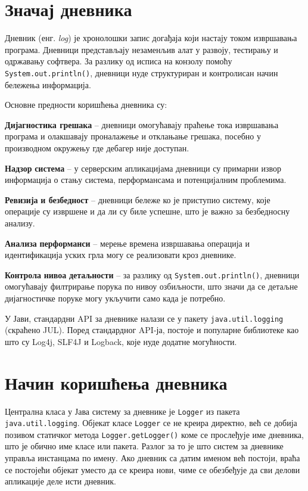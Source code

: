 \section{Значај дневника}

Дневник (енг. \textit{log}) је хронолошки запис догађаја који настају током извршавања програма. Дневници представљају незаменљив алат у развоју, тестирању и одржавању софтвера. За разлику од исписа на конзолу помоћу \texttt{System.out.println()}, дневници нуде структуриран и контролисан начин бележења информација.

Основне предности коришћења дневника су:

\textbf{Дијагностика грешака} – дневници омогућавају праћење тока извршавања програма и олакшавају проналажење и отклањање грешака, посебно у производном окружењу где дебагер није доступан.

\textbf{Надзор} \textbf{система} – у серверским апликацијама дневници су примарни извор информација о стању система, перформансама и потенцијалним проблемима.

\textbf{Ревизија} \textbf{и безбедност} – дневници бележе ко је приступио систему, које операције су извршене и да ли су биле успешне, што је важно за безбедносну анализу.

\textbf{Анализа} \textbf{перформанси} – мерење времена извршавања операција и идентификација уских грла могу се реализовати кроз дневнике.

\textbf{Контрола} \textbf{нивоа} \textbf{детаљности} – за разлику од \texttt{System.out.println()}, дневници омогућавају филтрирање порука по нивоу озбиљности, што значи да се детаљне дијагностичке поруке могу укључити само када је потребно.

У Јави, стандардни API за дневнике налази се у пакету \texttt{java.util.logging} (скраћено JUL). Поред стандардног API-ја, постоје и популарне библиотеке као што су Log4j, SLF4J и Logback, које нуде додатне могућности.


\section{Начин коришћења дневника}

Централна класа у Јава систему за дневнике је \texttt{Logger} из пакета \texttt{java.util.logging}. Објекат класе \texttt{Logger} се не креира директно, већ се добија позивом статичког метода \texttt{Logger.getLogger()} коме се прослеђује име дневника, што је обично име класе или пакета. Разлог за то је што систем за дневнике управља инстанцама по имену. Ако дневник са датим именом већ постоји, враћа се постојећи објекат уместо да се креира нови, чиме се обезбеђује да сви делови апликације деле исти дневник.


